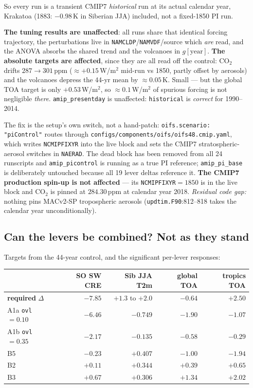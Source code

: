 \documentclass[10pt]{article}
\begin{document}
\noindent So every run is a transient CMIP7 \emph{historical} run at its actual calendar year, Krakatoa (1883:
$-0.98$\,K in Siberian JJA) included, not a fixed-1850 PI run.

\textbf{The tuning results are unaffected}: all runs share that identical forcing trajectory, the perturbations
live in \texttt{NAMCLDP}/\texttt{NAMVDF}/source which \emph{are} read, and the ANOVA absorbs the shared trend and
the volcanoes in $g[\mathrm{year}]$. \textbf{The absolute targets are affected}, since they are all read off the
control: CO$_2$ drifts $287\to301$\,ppm ($\approx+0.15$\,W/m$^2$ mid-run vs 1850, partly offset by aerosols) and
the volcanoes depress the 44-yr mean by $\approx0.05$\,K. Small --- but the global TOA target is only
$+0.53$\,W/m$^2$, so $\approx0.1$\,W/m$^2$ of spurious forcing is not negligible \emph{there}.
\texttt{amip\_presentday} is unaffected: \texttt{historical} is \emph{correct} for 1990--2014.

The fix is the setup's own switch, not a hand-patch: \texttt{oifs.scenario: "piControl"} routes through
\texttt{configs/components/oifs/oifs48.cmip.yaml}, which writes \texttt{NCMIPFIXYR} into the live block and sets
the CMIP7 stratospheric-aerosol switches in \texttt{NAERAD}. The dead block has been removed from all 24
runscripts and \texttt{amip\_picontrol} is running as a true PI reference; \texttt{amip\_pi\_base} is
deliberately untouched because all 19 lever deltas reference it. \textbf{The CMIP7 production spin-up is not
affected} --- its \texttt{NCMIPFIXYR}$=1850$ is in the live block and CO$_2$ is pinned at $284.30$\,ppm at
calendar year 2018. \emph{Residual code gap:} nothing pins MACv2-SP tropospheric aerosols
(\texttt{updtim.F90}:812--818 takes the calendar year unconditionally).

\subsection{Can the levers be combined? Not as they stand}\label{sub:combine}
Targets from the 44-year control, and the significant per-lever responses:

\begin{center}\footnotesize
\begin{tabular}{l r r r r}
\toprule
 & SO SW CRE & Sib JJA T2m & global TOA & tropics TOA \\
\midrule
\textbf{required} $\Delta$ & $\mathbf{-7.85}$ & $\mathbf{+1.3}$ to $\mathbf{+2.0}$ & $\mathbf{-0.64}$ & $\mathbf{+2.50}$ \\
\midrule
A1a \texttt{ovl}$=0.10$ & $\mathbf{-6.46}$ & $-0.749$ & $-1.90$ & $-1.07$ \\
A1b \texttt{ovl}$=0.35$ & $-2.17$ & $-0.135$ & $-0.58$ & $-0.29$ \\
B5 & $-0.23$ & $\mathbf{+0.407}$ & $-1.00$ & $\mathbf{-1.94}$ \\
B2 & $+0.11$ & $+0.344$ & $+0.39$ & $+0.65$ \\
B3 & $+0.67$ & $+0.306$ & $+1.34$ & $\mathbf{+2.02}$ \\
\bottomrule
\end{tabular}
\end{center}
\end{document}
